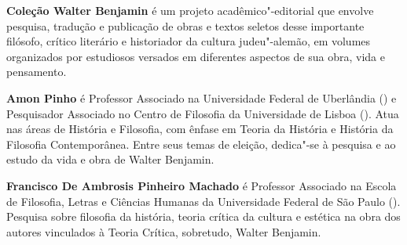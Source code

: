 \textbf{Coleção Walter Benjamin} é um projeto acadêmico"-editorial que envolve pesquisa, tradução e publicação de obras e textos seletos desse importante filósofo, crítico literário e historiador da cultura judeu"-alemão, em volumes organizados por estudiosos versados em diferentes aspectos de sua obra, vida e pensamento. 

\textbf{Amon Pinho} é Professor Associado na Universidade Federal de Uberlândia () e Pesquisador Associado no Centro de Filosofia da Universidade de Lisboa (). Atua nas
áreas de História e Filosofia, com ênfase em Teoria da História e História da Filosofia
Contemporânea. Entre seus temas de eleição, dedica"-se à pesquisa e ao estudo da vida e obra de
Walter Benjamin.

\textbf{Francisco De Ambrosis Pinheiro Machado} é Professor Associado na Escola de Filosofia, Letras e Ciências Humanas da Universidade Federal de São Paulo (). Pesquisa sobre filosofia da história, teoria crítica da cultura e estética na obra dos autores vinculados à Teoria Crítica, sobretudo, Walter Benjamin.


